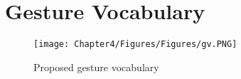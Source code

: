 
\chapter{Gesture Vocabulary} 
\label{chap:appendixA}


\begin{figure}
    \centering
    \texttt{[image: Chapter4/Figures/Figures/gv.PNG]}
    \caption{Proposed gesture vocabulary}
    \label{fig:gs}
\end{figure}

